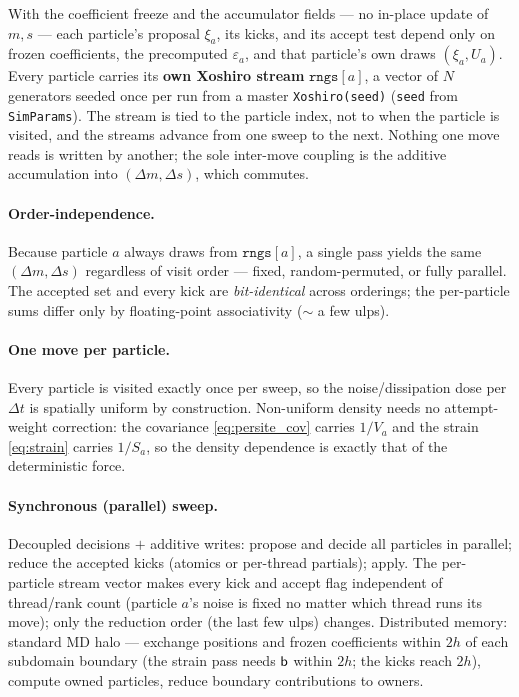 \documentclass[12pt,aps,preprint,nofootinbib,noshowkeys,noshowpacs,longbibliography,superscriptaddress,tightenlines]{revtex4-2}
\def\bbeta{{\sf b}}
\begin{document}
With the coefficient freeze and the accumulator fields --- no in-place update
of $m,s$ --- each particle's proposal $\xi_a$, its kicks, and its accept test
depend only on frozen coefficients, the precomputed $\varepsilon_a$, and that
particle's own draws $(\xi_a,U_a)$.  Every particle carries its \textbf{own
Xoshiro stream} $\texttt{rngs}[a]$, a vector of $N$ generators seeded once per
run from a master \texttt{Xoshiro(seed)} (\texttt{seed} from \texttt{SimParams}).
The stream is tied to the particle index, not to when the particle is visited,
and the streams advance from one sweep to the next.  Nothing one move reads is
written by another; the sole inter-move coupling is the additive accumulation
into $(\Delta m,\Delta s)$, which commutes.

\paragraph{Order-independence.}
Because particle $a$ always draws from $\texttt{rngs}[a]$, a single pass yields
the same $(\Delta m,\Delta s)$ regardless of visit order --- fixed,
random-permuted, or fully parallel.  The accepted set and every kick are
\emph{bit-identical} across orderings; the per-particle sums differ only by
floating-point associativity ($\sim$ a few ulps).

\paragraph{One move per particle.}
Every particle is visited exactly once per sweep, so the noise/dissipation dose
per $\Delta t$ is spatially uniform by construction.  Non-uniform density
needs no attempt-weight correction: the covariance \eqref{eq:persite_cov}
carries $1/V_a$ and the strain \eqref{eq:strain} carries $1/S_a$, so the
density dependence is exactly that of the deterministic force.

\paragraph{Synchronous (parallel) sweep.}
Decoupled decisions $+$ additive writes: propose and decide all particles in
parallel; reduce the accepted kicks (atomics or per-thread partials); apply.
The per-particle stream vector makes every kick and accept flag independent of
thread/rank count (particle $a$'s noise is fixed no matter which thread runs
its move); only the reduction order (the last few ulps) changes.  Distributed
memory: standard MD halo --- exchange positions and frozen coefficients within
$2h$ of each subdomain boundary (the strain pass needs $\bbeta$ within $2h$;
the kicks reach $2h$), compute owned particles, reduce boundary contributions to
owners.
\end{document}
